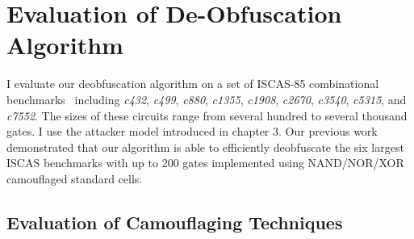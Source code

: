 \documentclass[proposal]{umassthesis}  %
\begin{document}
\chapter{Evaluation of De-Obfuscation Algorithm}
I evaluate our deobfuscation algorithm on a set of ISCAS-85 combinational benchmarks~\cite{hansen-99} including \textit{c432}, \textit{c499},  \textit{c880}, \textit{c1355}, \textit{c1908}, \textit{c2670}, \textit{c3540},  \textit{c5315}, and \textit{c7552}. The sizes of these circuits range from several hundred to several thousand gates. I use the attacker model introduced in chapter 3. Our previous work~\cite{duo-date16} demonstrated that our algorithm is able to efficiently deobfuscate the six largest ISCAS benchmarks with up to 200 gates implemented using NAND/NOR/XOR camouflaged standard cells. %








\section{Evaluation of Camouflaging Techniques}
\end{document}

